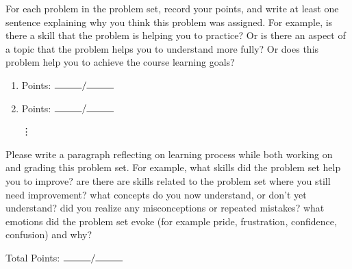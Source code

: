 \documentclass[11pt]{article}
\begin{document}


\bigskip
For each problem in the problem set, record your points, and write at least one sentence explaining why you think this problem was assigned. For example, is there a skill that the problem is helping you to practice? Or is there an aspect of a topic that the problem helps you to understand more fully? Or does this problem help you to achieve the course learning goals?
\begin{enumerate}
\item Points: $\rule{1cm}{0.15mm}/\rule{1cm}{0.15mm}$
\vspace{2cm}
\item Points: $\rule{1cm}{0.15mm}/\rule{1cm}{0.15mm}$

\vspace{1cm}
\hspace{2cm} {\Large\vdots}
\end{enumerate}

\vfill
Please write a paragraph reflecting on learning process while both working on and grading this problem set. For example, what skills did the problem set help you to improve? are there are skills related to the problem set where you still need improvement? what concepts do you now understand, or don't yet understand? did you realize any misconceptions or repeated mistakes? what emotions did the problem set evoke (for example pride, frustration, confidence, confusion) and why?

\vspace{5cm}
\noindent Total Points: $\rule{1cm}{0.15mm}/\rule{1cm}{0.15mm}$
\end{document}
